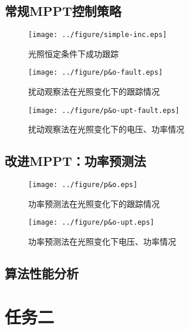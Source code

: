 \documentclass[a4paper,12pt]{article}
\begin{document}
    \subsection{常规MPPT控制策略} %
    \label{sub:常规mppt控制策略}
    \begin{figure}[htbp]
        \centering
        \texttt{[image: ../figure/simple-inc.eps]}
        \caption{光照恒定条件下成功跟踪}
        \label{fig:simple-inc}
    \end{figure}
    \begin{figure}[htbp]
        \centering
        \texttt{[image: ../figure/p\&o-fault.eps]}
        \caption{扰动观察法在光照变化下的跟踪情况}
        \label{fig:po-fault}
    \end{figure}
    \begin{figure}[htbp]
        \centering
        \texttt{[image: ../figure/p\&o-upt-fault.eps]}
        \caption{扰动观察法在光照变化下的电压、功率情况}
        \label{fig:po-fault-upt}
    \end{figure}
    \subsection{改进MPPT：功率预测法} %
    \label{sub:改进mppt_功率预测法}
    \begin{figure}[htbp]
        \centering
        \texttt{[image: ../figure/p\&o.eps]}
        \caption{功率预测法在光照变化下的跟踪情况}
        \label{fig:po}
    \end{figure}
    \begin{figure}[htbp]
        \centering
        \texttt{[image: ../figure/p\&o-upt.eps]}
        \caption{功率预测法在光照变化下电压、功率情况}
        \label{fig:po-upt}
    \end{figure}
    \subsection{算法性能分析} %
    \label{sub:算法性能分析}
    
    \section{任务二} %
    \label{sec:任务二}
\end{document}
